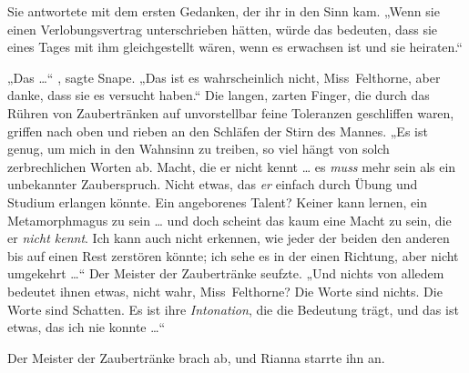 Sie antwortete mit dem ersten Gedanken, der ihr in den Sinn kam.
„Wenn sie einen Verlobungsvertrag unterschrieben hätten, würde das bedeuten, dass sie eines Tages mit ihm gleichgestellt wären, wenn es erwachsen ist und sie heiraten.“

„Das …“ , sagte Snape.
„Das ist es wahrscheinlich nicht, Miss~Felthorne, aber danke, dass sie es versucht haben.“ Die langen, zarten Finger, die durch das Rühren von Zaubertränken auf unvorstellbar feine Toleranzen geschliffen waren, griffen nach oben und rieben an den Schläfen der Stirn des Mannes.
„Es ist genug, um mich in den Wahnsinn zu treiben, so viel hängt von solch zerbrechlichen Worten ab. Macht, die er nicht kennt … es \emph{muss} mehr sein als ein unbekannter Zauberspruch. Nicht etwas, das \emph{er} einfach durch Übung und Studium erlangen könnte. Ein angeborenes Talent? Keiner kann lernen, ein Metamorphmagus zu sein … und doch scheint das kaum eine Macht zu sein, die er \emph{nicht kennt}. Ich kann auch nicht erkennen, wie jeder der beiden den anderen bis auf einen Rest zerstören könnte; ich sehe es in der einen Richtung, aber nicht umgekehrt …“ Der Meister der Zaubertränke seufzte.
„Und nichts von alledem bedeutet ihnen etwas, nicht wahr, Miss~Felthorne? Die Worte sind nichts. Die Worte sind Schatten. Es ist ihre \emph{Intonation}, die die Bedeutung trägt, und das ist etwas, das ich nie konnte …“

Der Meister der Zaubertränke brach ab, und Rianna starrte ihn an.

